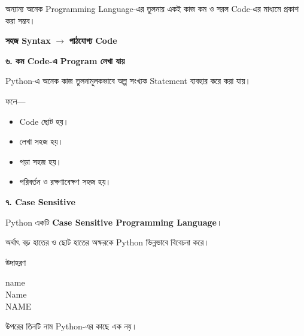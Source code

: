 অন্যান্য অনেক Programming Language-এর তুলনায় একই কাজ
কম ও সরল Code-এর মাধ্যমে প্রকাশ করা সম্ভব।

\begin{center}

\textbf{সহজ Syntax}
\(\longrightarrow\)
\textbf{পাঠযোগ্য Code}

\end{center}


\textbf{\color{darkTeal}৬. কম Code-এ Program লেখা যায়}

Python-এ অনেক কাজ তুলনামূলকভাবে অল্প সংখ্যক Statement
ব্যবহার করে করা যায়।

ফলে—

\begin{itemize}

\item Code ছোট হয়।

\item লেখা সহজ হয়।

\item পড়া সহজ হয়।

\item পরিবর্তন ও রক্ষণাবেক্ষণ সহজ হয়।

\end{itemize}


\textbf{\color{darkTeal}৭. Case Sensitive}

Python একটি
\textbf{Case Sensitive Programming Language}।

অর্থাৎ বড় হাতের ও ছোট হাতের অক্ষরকে Python ভিন্নভাবে বিবেচনা করে।

\begin{examplebox}{উদাহরণ}

\begin{codebox}

\begin{english}
\ttfamily
name\\
Name\\
NAME
\end{english}

\end{codebox}

উপরের তিনটি নাম Python-এর কাছে এক নয়।

\end{examplebox}

